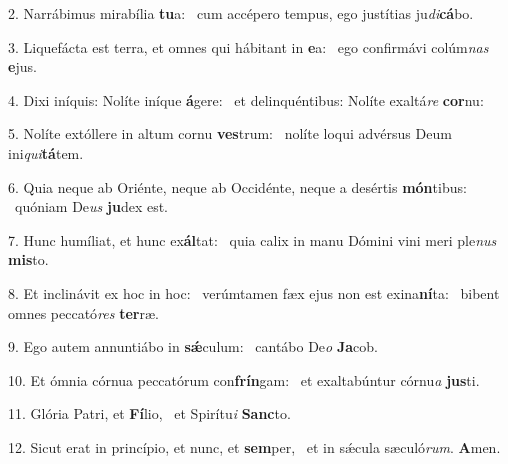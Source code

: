 2. Narrábimus mirabília \textbf{tu}a: \ast\  cum accépero tempus, ego justítias ju\textit{di}\textbf{cá}bo.\

3. Liquefácta est terra, et omnes qui hábitant in \textbf{e}a: \ast\  ego confirmávi colúm\textit{nas} \textbf{e}jus.\

4. Dixi iníquis: Nolíte iníque \textbf{á}gere: \ast\  et delinquéntibus: Nolíte exaltá\textit{re} \textbf{cor}nu:\

5. Nolíte extóllere in altum cornu \textbf{ves}trum: \ast\  nolíte loqui advérsus Deum ini\textit{qui}\textbf{tá}tem.\

6. Quia neque ab Oriénte, neque ab Occidénte, neque a desértis \textbf{món}tibus: \ast\  quóniam De\textit{us} \textbf{ju}dex est.\

7. Hunc humíliat, et hunc ex\textbf{ál}tat: \ast\  quia calix in manu Dómini vini meri ple\textit{nus} \textbf{mis}to.\

8. Et inclinávit ex hoc in hoc: \dag\  verúmtamen fæx ejus non est exina\textbf{ní}ta: \ast\  bibent omnes peccató\textit{res} \textbf{ter}ræ.\

9. Ego autem annuntiábo in \textbf{sǽ}culum: \ast\  cantábo De\textit{o} \textbf{Ja}cob.\

10. Et ómnia córnua peccatórum con\textbf{frín}gam: \ast\  et exaltabúntur córnu\textit{a} \textbf{jus}ti.\

11. Glória Patri, et \textbf{Fí}lio, \ast\  et Spirítu\textit{i} \textbf{Sanc}to.\

12. Sicut erat in princípio, et nunc, et \textbf{sem}per, \ast\  et in sǽcula sæculó\textit{rum}. \textbf{A}men.\

